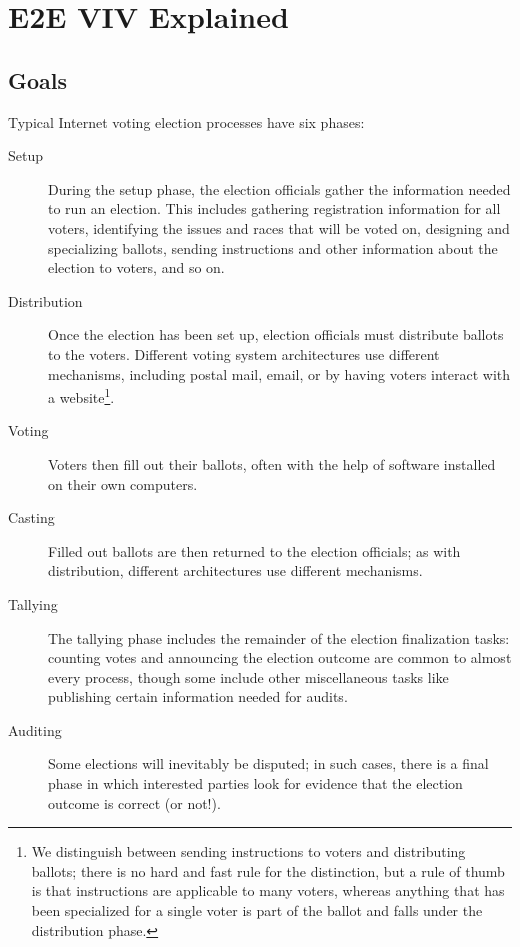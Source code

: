 \chapter{E2E VIV Explained}
\label{chapter:e2e_viv_explained}


\section{Goals}
Typical Internet voting election processes have six phases:

\begin{description}
  \item[Setup] During the setup phase, the election officials gather the
    information needed to run an election. This includes gathering
    registration information for all voters, identifying the issues and
    races that will be voted on, designing and specializing ballots,
    sending instructions and other information about the election to voters,
    and so on.
  \item[Distribution] Once the election has been set up, election officials
    must distribute ballots to the voters. Different voting system
    architectures use different mechanisms, including postal mail, email, or
    by having voters interact with a website\footnote{We distinguish between
    sending instructions to voters and distributing ballots; there is no
    hard and fast rule for the distinction, but a rule of thumb is that
    instructions are applicable to many voters, whereas anything that has
    been specialized for a single voter is part of the ballot and falls
    under the distribution phase.}.
  \item[Voting] Voters then fill out their ballots, often with the help of
    software installed on their own computers.
  \item[Casting] Filled out ballots are then returned to the election
    officials; as with distribution, different architectures use different
    mechanisms.
  \item[Tallying] The tallying phase includes the remainder of the election
    finalization tasks: counting votes and announcing the election outcome
    are common to almost every process, though some include other
    miscellaneous tasks like publishing certain information needed for
    audits.
  \item[Auditing] Some elections will inevitably be disputed; in such cases,
    there is a final phase in which interested parties look for evidence
    that the election outcome is correct (or not!).
\end{description}

